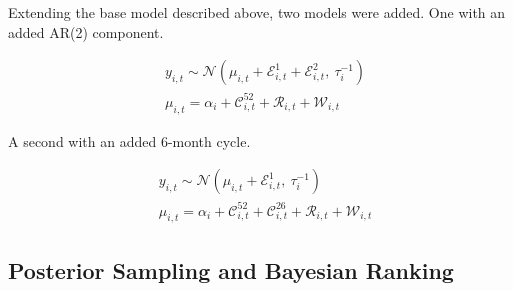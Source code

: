 \documentclass[
]{article}
\begin{document}
Extending the base model described above, two models were added. One with an added AR(2) component.

\begin{equation}
  \begin{aligned}
    &y_{i,t} \sim \mathcal{N}\!\left(\mu_{i,t} + 
    \mathcal{E}^{1}_{i,t} + 
    \mathcal{E}^{2}_{i,t},\ \tau_i^{-1}\right)\\
    &\mu_{i,t} = \alpha_i + \mathcal{C}_{i,t}^{52} + \mathcal{R}_{i,t} + \mathcal{W}_{i,t}
  \end{aligned}
  \label{eq:extended-AR2}
\end{equation}

A second with an added 6-month cycle.

\begin{equation}
  \begin{aligned}
    &y_{i,t} \sim \mathcal{N}\!\left(\mu_{i,t} + 
    \mathcal{E}^{1}_{i,t},\ \tau_i^{-1}\right)\\
    &\mu_{i,t} = \alpha_i + 
    \mathcal{C}_{i,t}^{52} + 
    \mathcal{C}_{i,t}^{26} + \mathcal{R}_{i,t} + \mathcal{W}_{i,t}
  \end{aligned}
  \label{eq:extended-6-month}
\end{equation}

\subsection{\texorpdfstring{Posterior Sampling and Bayesian Ranking \label{sect:ranking}}{Posterior Sampling and Bayesian Ranking }}\label{posterior-sampling-and-bayesian-ranking}
\end{document}
